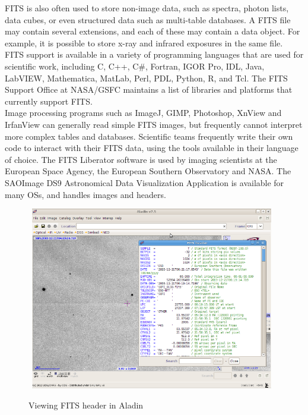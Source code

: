 FITS is also often used to store non-image data, such as spectra, photon lists, data cubes, or even structured data such as multi-table databases. A FITS file may contain several extensions, and each of these may contain a data object. For example, it is possible to store x-ray and infrared exposures in the same file.\\
 
FITS support is available in a variety of programming languages that are used for scientific work, including C, C++, C\#, Fortran, IGOR Pro, IDL, Java, LabVIEW, Mathematica, MatLab, Perl, PDL, Python, R, and Tcl. The FITS Support Office at NASA/GSFC maintains a list of libraries and platforms that currently support FITS.\\
 
Image processing programs such as ImageJ, GIMP, Photoshop, XnView and IrfanView can generally read simple FITS images, but frequently cannot interpret more complex tables and databases. Scientific teams frequently write their own code to interact with their FITS data, using the tools available in their language of choice. The FITS Liberator software is used by imaging scientists at the European Space Agency, the European Southern Observatory and NASA. The SAOImage DS9 Astronomical Data Visualization Application is available for many OSs, and handles images and headers.\\


\begin{figure}[H]
\centering
\includegraphics[width=11cm,height=8cm]{images/fits_header.png}\\
\caption{Viewing FITS header in Aladin}
\end{figure}

